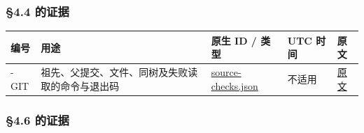 \documentclass[
]{article}
\newcounter{none} %
\begin{document}
\subsubsection{§4.4 的证据}\label{ux7684ux8bc1ux636e-5}

{\def\LTcaptype{none} %
\begin{longtable}[]{@{}
  >{\raggedright\arraybackslash}p{}
  >{\raggedright\arraybackslash}p{}
  >{\raggedright\arraybackslash}p{}
  >{\raggedright\arraybackslash}p{}
  >{\raggedright\arraybackslash}p{}@{}}
\toprule\noalign{}
\begin{minipage}[b]{\linewidth}\raggedright
编号
\end{minipage} & \begin{minipage}[b]{\linewidth}\raggedright
用途
\end{minipage} & \begin{minipage}[b]{\linewidth}\raggedright
原生 ID / 类型
\end{minipage} & \begin{minipage}[b]{\linewidth}\raggedright
UTC 时间
\end{minipage} & \begin{minipage}[b]{\linewidth}\raggedright
原文
\end{minipage} \\
\midrule\noalign{}
\endhead
\bottomrule\noalign{}
\endlastfoot
008-GIT & 祖先、父提交、文件、同树及失败读取的命令与退出码 &
\href{/Users/oopslink/works/research/agent-harness-study/run-001/evolution-008/logs/source-checks.json}{source-checks.json}
& 不适用 &
\href{/Users/oopslink/works/research/agent-harness-study/run-001/evolution-008/logs/source-checks.json}{原文} \\
\end{longtable}
}

\subsubsection{§4.6 的证据}\label{ux7684ux8bc1ux636e-6}
\end{document}
